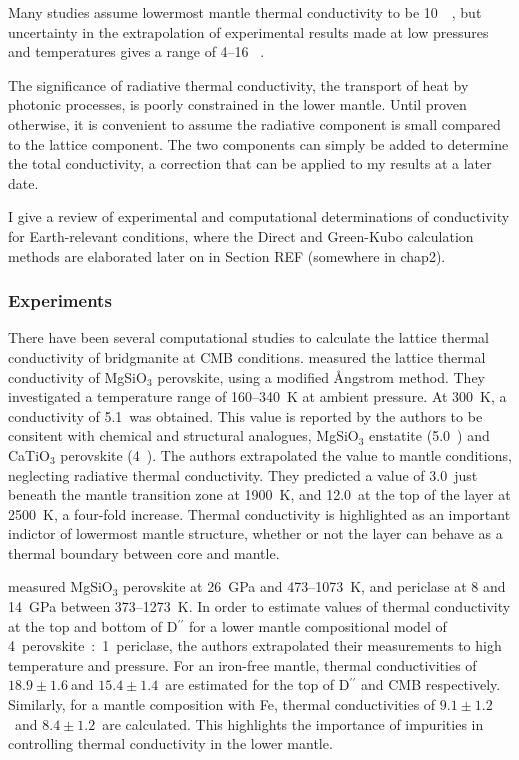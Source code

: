 Many studies assume lowermost mantle thermal conductivity to be 10~\wmk\ \citep[e.g.][]{Lay2008}, but uncertainty in the extrapolation of experimental results made at low pressures and temperatures gives a range of 4--16 \wmk~\citep{Brown1986, Osako1991, Hofmeister1999, Goncharov2009, Manthilake2011, Ohta2012}. 

The significance of radiative thermal conductivity, the transport of heat by photonic processes, is poorly constrained in the lower mantle. Until proven otherwise, it is convenient to assume the radiative component is small compared to the lattice component. The two components can simply be added to determine the total conductivity, a correction that can be applied to my results at a later date.

I give a review of experimental and computational determinations of conductivity for Earth-relevant conditions, where the Direct and Green-Kubo calculation methods are elaborated later on in Section REF (somewhere in chap2).

\subsubsection{Experiments}

There have been several computational studies to calculate the lattice thermal conductivity of bridgmanite at CMB conditions. \citet{Osako1991} measured the lattice thermal conductivity of MgSiO$_3$ perovskite, using a modified \AA ngstrom method. They investigated a temperature range of 160--340~K at ambient pressure. At 300~K, a conductivity of 5.1~\wmks was obtained. This value is reported by the authors to be consitent with chemical and structural analogues, MgSiO$_3$ enstatite (5.0~\wmk) and CaTiO$_{3}$ perovskite (4~\wmk). The authors extrapolated the value to mantle conditions, neglecting radiative thermal conductivity. They predicted a value of 3.0~\wmks just beneath the mantle transition zone at 1900~K, and 12.0~\wmks at the top of the \ddds layer at 2500~K, a four-fold increase. Thermal conductivity is highlighted as an important indictor of lowermost mantle structure, whether or not the \ddds layer can behave as a thermal boundary between core and mantle.

\citet{Manthilake2011} measured MgSiO$_3$ perovskite at 26~GPa and 473--1073~K, and periclase at 8 and 14~GPa between 373--1273~K. In order to estimate values of thermal conductivity at the top and bottom of D$^{\prime \prime}$ for a lower mantle compositional model of 4~perovskite~:~1~periclase, the authors extrapolated their measurements to high temperature and pressure. For an iron-free mantle, thermal conductivities of $18.9\pm1.6~$\wmks and $15.4\pm1.4$~\wmks are estimated for the top of D$^{\prime \prime}$ and CMB respectively. Similarly, for a mantle composition with Fe, thermal conductivities of $9.1\pm1.2$~\wmks and $8.4\pm1.2$~\wmks are calculated. This highlights the importance of impurities in controlling thermal conductivity in the lower mantle.

